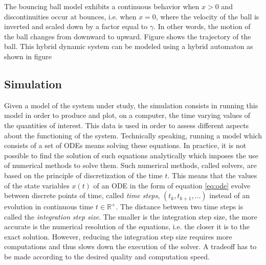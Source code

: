 The bouncing ball model exhibits a continuous behavior when $x > 0$ and discontinuities occur at bounces, i.e. when $x = 0$, where the velocity of the ball is inverted and scaled down by a factor equal to $\gamma$. In other words, the motion of the ball changes from downward to upward. Figure %
shows the trajectory of the ball. This hybrid dynamic system can be modeled using a hybrid automaton as shown in figure %

%

%

\subsection{Simulation}

Given a model of the system under study, the simulation consists in running this model in order to produce and plot, on a computer, the time varying values of the quantities of interest. This data is used in order to assess different aspects about the functioning of the system. Technically speaking, running a model which consists of a set of ODEs means solving these equations. In practice, it is not possible to find the solution of such equations analytically which imposes the use of numerical methods to solve them. Such numerical methods, called solvers, are based on the principle of discretization of the time $t$. This means that the values of the state variables $x(t)$ of an ODE in the form of equation \ref{eq:ode} evolve between discrete points of time, called \textit{time steps}, $(t_k, t_{k+1}, \ldots)$ instead of an evolution in continuous time $t \in \mathbb{R}^+$. The distance between two time steps is called the \textit{integration step size}. The smaller is the integration step size, the more accurate is the numerical resolution of the equations, i.e. the closer it is to the exact solution. However, reducing the integration step size requires more computations and thus slows down the execution of the solver. A tradeoff has to be made according to the desired quality and computation speed.

